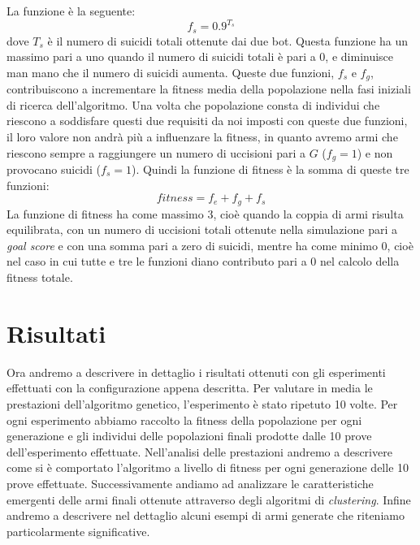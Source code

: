 \documentclass[12pt, italian]{toptesi}
\begin{document}
La funzione è la seguente:
\begin{equation}
f_s =  0.9^{T_s}
\end{equation}
dove $T_s$ è il numero di suicidi totali ottenute dai due bot. Questa funzione ha un massimo pari a uno quando il numero di suicidi totali è pari a 0, e diminuisce man mano che il numero di suicidi aumenta.
Queste due funzioni, $f_s$ e $f_g$, contribuiscono a incrementare la fitness media della popolazione nella fasi iniziali di ricerca dell'algoritmo. Una volta che popolazione consta di individui che riescono a soddisfare questi due requisiti da noi imposti con queste due funzioni, il loro valore non andrà più a influenzare la fitness,  in quanto avremo armi che riescono sempre a raggiungere un numero di uccisioni pari a $G$ ($f_g = 1$) e non provocano suicidi  ($f_s = 1$).
Quindi la funzione di fitness è la somma di queste tre funzioni:
\begin{equation}
fitness = f_e + f_g + f_s
\end{equation}
La funzione di fitness ha come massimo 3, cioè quando la coppia di armi risulta equilibrata, con un numero di uccisioni totali ottenute nella simulazione pari a \emph{goal score} e con una somma pari a zero di suicidi, mentre ha come minimo 0,
cioè nel caso in cui tutte e tre le funzioni diano contributo pari a 0 nel calcolo della fitness totale.

\section{Risultati}

Ora andremo a descrivere in dettaglio i risultati ottenuti con gli esperimenti effettuati con la configurazione appena descritta.
Per valutare in media le prestazioni dell'algoritmo genetico, l'esperimento è stato ripetuto 10 volte. Per ogni esperimento abbiamo raccolto la fitness della popolazione per ogni generazione e gli individui delle popolazioni finali prodotte dalle 10 prove dell'esperimento effettuate.
Nell'analisi delle prestazioni andremo a descrivere come si è comportato l'algoritmo a livello di fitness per ogni generazione delle 10 prove effettuate.
Successivamente andiamo ad analizzare le caratteristiche emergenti delle armi finali ottenute attraverso degli algoritmi di \emph{clustering}.
Infine andremo a descrivere nel dettaglio alcuni esempi di armi generate che riteniamo particolarmente significative.
\end{document}
